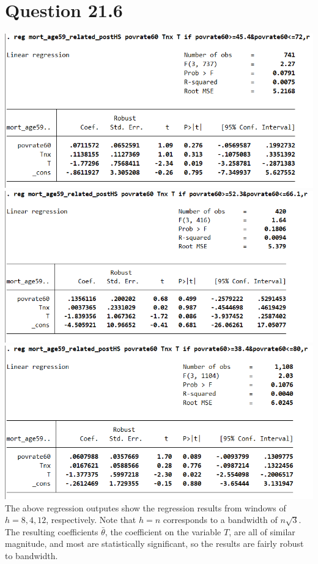 \documentclass[11pt]{article} %
\begin{document}
\section{Question 21.6} %
\includegraphics{p7}\\
\includegraphics{p8}\\
\includegraphics{p9}\\
The above regression outputes show the regression results from windows of $h = 8,4,12$, respectively. Note that $h=n$ corresponds to a bandwidth of $n\sqrt{3}$. The resulting coefficients $\bar{\theta}$, the coefficient on the variable $T$, are all of similar magnitude, and most are statistically significant, so the results are fairly robust to bandwidth.
\end{document}

